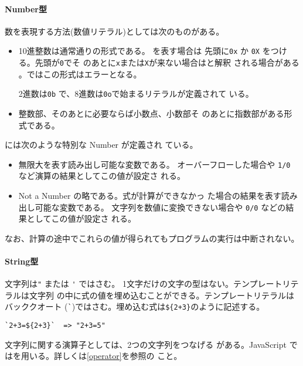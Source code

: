 \paragraph{Number型}
数を表現する方法(数値リテラル)としては次のものがある。
\begin{itemize}
 \item{\bfseries {}} 10進整数は通常通りの形式である。
      を表す場合は
	      先頭に\Verb+0x+ か \Verb+0X+ をつける。先頭が\Verb+0+でそ
	      のあとに\Verb+x+または\Verb+X+が来ない場合はと解釈
      される場合がある
      。\Strict ではこの形式はエラーとなる。

      2進数は\Verb+0b+ で、8進数は\Verb+0o+で始まるリテラルが定義されて
      いる。
 \item{\bfseries {}} 整数部、そのあとに必要ならば小数点、小数部そ
       のあとに指数部がある形式である。
\end{itemize}
には次のような特別な Number が定義され
ている。
\begin{itemize}
 \item {\bfseries {}}無限大を表す読み出し可能な変数である。
       オーバーフローした場合や \Verb+1/0+ など演算の結果としてこの値が設定さ
       れる。
 \item {\bfseries {}} Not a Number の略である。式が計算ができなかっ
       た場合の結果を表す読み出し可能な変数である。
       文字列を数値に変換できない場合や \Verb+0/0+ などの結果としてこの値が設定さ
       れる。
\end{itemize}
なお、計算の途中でこれらの値が得られてもプログラムの実行は中断されない。
\paragraph{String型}
文字列は\Verb+"+ または \Verb+'+ ではさむ。%
1文字だけの文字の型はない。テンプレートリテラルは文字列
の中に式の値を埋め込むことができる。テンプレートリテラルはバッククオート
(\Verb+`+)ではさむ。埋め込む式は\texttt{\$\{2+3\}}のように記述する。
\begin{Verbatim}
`2+3=${2+3}`  => "2+3=5"
\end{Verbatim}
文字列に関する演算子としては、2つの文字列をつなげる
がある。JavaScript では\ElmJ{+}を用いる。詳しくは\ref{operator}を参照の
こと。

